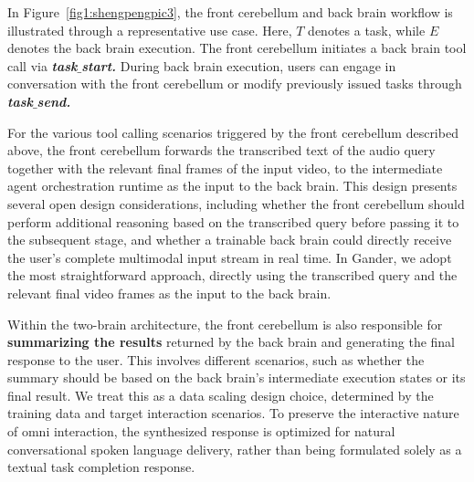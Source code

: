 In Figure~\ref{fig1:shengpengpic3}, the front cerebellum and back brain workflow is illustrated through a representative use case. Here, $T$ denotes a task, while $E$ denotes the back brain execution. The front cerebellum initiates a back brain tool call via \textbf{\textit{task$\_$start.}} During back brain execution, users can engage in conversation with the front cerebellum or modify previously issued tasks through \textbf{\textit{task$\_$send.}}

For the various tool calling scenarios triggered by the front cerebellum described above, the front cerebellum forwards the transcribed text of the audio query together with the relevant final frames of the input video, to the intermediate agent orchestration runtime as the input to the back brain. This design presents several open design considerations, including whether the front cerebellum should perform additional reasoning based on the transcribed query before passing it to the subsequent stage, and whether a trainable back brain could directly receive the user's complete multimodal input stream in real time. In Gander, we adopt the most straightforward approach, directly using the transcribed query and the relevant final video frames as the input to the back brain.

Within the two-brain architecture, the front cerebellum is also responsible for \textbf{summarizing the results} returned by the back brain and generating the final response to the user. This involves different scenarios, such as whether the summary should be based on the back brain's intermediate execution states or its final result. We treat this as a data scaling design choice, determined by the training data and target interaction scenarios. To preserve the interactive nature of omni interaction, the synthesized response is optimized for natural conversational spoken language delivery, rather than being formulated solely as a textual task completion response.



